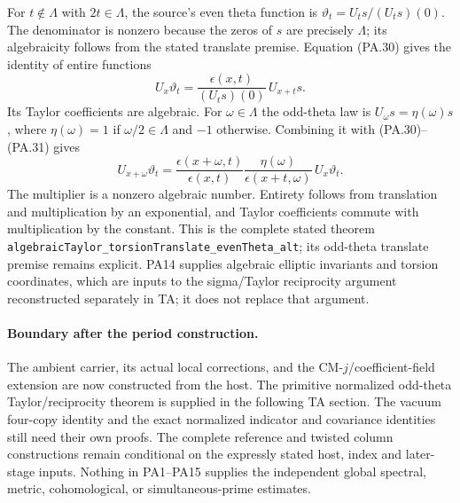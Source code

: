 For $t\notin\Lambda$ with $2t\in\Lambda$, the source's even
theta function is $\vartheta_t=U_ts/(U_ts)(0)$. The denominator
is nonzero because the zeros of $s$ are precisely $\Lambda$;
its algebraicity follows from the stated translate premise.
Equation (PA.30) gives the identity of entire functions
\[
 U_x\vartheta_t=
       \frac{\epsilon(x,t)}{(U_ts)(0)}\,U_{x+t}s.                \tag{PA.31}
\]
Its Taylor coefficients are algebraic. For $\omega\in\Lambda$
the odd-theta law is
$U_\omega s=\eta(\omega)s$, where
$\eta(\omega)=1$ if $\omega/2\in\Lambda$ and $-1$ otherwise.
Combining it with (PA.30)--(PA.31) gives
\[
 U_{x+\omega}\vartheta_t=
 \frac{\epsilon(x+\omega,t)}{\epsilon(x,t)}
 \frac{\eta(\omega)}{\epsilon(x+t,\omega)}\,U_x\vartheta_t.
                                                               \tag{PA.32}
\]
The multiplier is a nonzero algebraic number. Entirety follows
from translation and multiplication by an exponential, and
Taylor coefficients commute with multiplication by the constant.
This is the complete stated theorem
\texttt{algebraicTaylor\_torsionTranslate\_evenTheta\_alt}; its
odd-theta translate premise remains explicit. PA14 supplies
algebraic elliptic invariants and torsion coordinates, which are
inputs to the sigma/Taylor reciprocity argument reconstructed
separately in TA; it does not replace that argument.

\paragraph{Boundary after the period construction.}
The ambient carrier, its actual local corrections, and the
CM-$j$/coefficient-field extension are now constructed from the
host. The primitive normalized odd-theta Taylor/reciprocity theorem
is supplied in the following TA section. The vacuum four-copy
identity and the exact normalized indicator and covariance
identities still need their own proofs.
The complete reference and twisted column constructions remain
conditional on the expressly stated host, index and later-stage
inputs. Nothing in PA1--PA15 supplies the independent global
spectral, metric, cohomological, or simultaneous-prime estimates.
